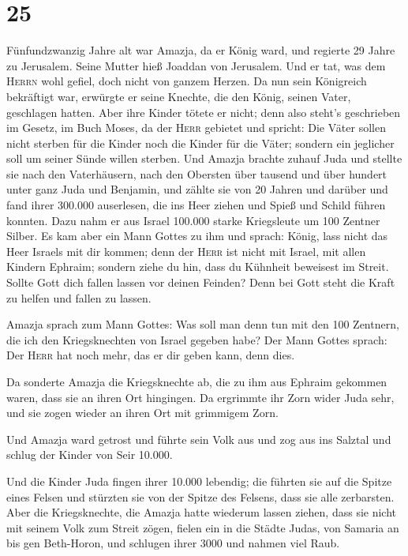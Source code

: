 \hypertarget{section-24}{%
\section{25}\label{section-24}}

 Fünfundzwanzig Jahre alt war Amazja, da er König ward,
und regierte 29 Jahre zu Jerusalem. Seine Mutter hieß Joaddan von
Jerusalem.  Und er tat, was dem \textsc{Herrn} wohl
gefiel, doch nicht von ganzem Herzen.  Da nun sein
Königreich bekräftigt war, erwürgte er seine Knechte, die den König,
seinen Vater, geschlagen hatten.  Aber ihre Kinder tötete
er nicht; denn also steht's geschrieben im Gesetz, im Buch Moses, da der
\textsc{Herr} gebietet und spricht: Die Väter sollen nicht sterben für
die Kinder noch die Kinder für die Väter; sondern ein jeglicher soll um
seiner Sünde willen sterben.  Und Amazja brachte zuhauf
Juda und stellte sie nach den Vaterhäusern, nach den Obersten über
tausend und über hundert unter ganz Juda und Benjamin, und zählte sie
von 20 Jahren und darüber und fand ihrer 300.000 auserlesen, die ins
Heer ziehen und Spieß und Schild führen konnten.  Dazu
nahm er aus Israel 100.000 starke Kriegsleute um 100 Zentner Silber.
 Es kam aber ein Mann Gottes zu ihm und sprach: König,
lass nicht das Heer Israels mit dir kommen; denn der \textsc{Herr} ist
nicht mit Israel, mit allen Kindern Ephraim;  sondern
ziehe du hin, dass du Kühnheit beweisest im Streit. Sollte Gott dich
fallen lassen vor deinen Feinden? Denn bei Gott steht die Kraft zu
helfen und fallen zu lassen.

 Amazja sprach zum Mann Gottes: Was soll man denn tun mit
den 100 Zentnern, die ich den Kriegsknechten von Israel gegeben habe?
Der Mann Gottes sprach: Der \textsc{Herr} hat noch mehr, das er dir
geben kann, denn dies.

 Da sonderte Amazja die Kriegsknechte ab, die zu ihm aus
Ephraim gekommen waren, dass sie an ihren Ort hingingen. Da ergrimmte
ihr Zorn wider Juda sehr, und sie zogen wieder an ihren Ort mit
grimmigem Zorn.

 Und Amazja ward getrost und führte sein Volk aus und zog
aus ins Salztal und schlug der Kinder von Seir 10.000.

 Und die Kinder Juda fingen ihrer 10.000 lebendig; die
führten sie auf die Spitze eines Felsen und stürzten sie von der Spitze
des Felsens, dass sie alle zerbarsten.  Aber die
Kriegsknechte, die Amazja hatte wiederum lassen ziehen, dass sie nicht
mit seinem Volk zum Streit zögen, fielen ein in die Städte Judas, von
Samaria an bis gen Beth-Horon, und schlugen ihrer 3000 und nahmen viel
Raub.

